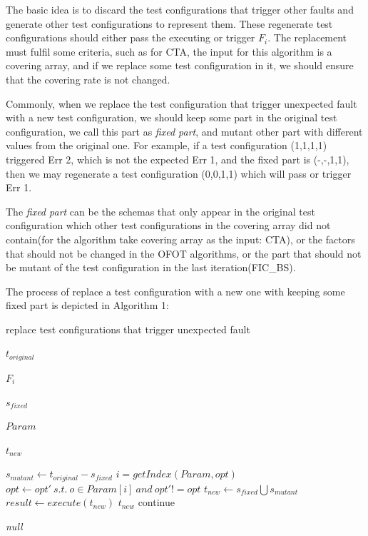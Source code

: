 \documentclass{sig-alternate}
\begin{document}
The basic idea is to discard the test configurations that trigger other faults and generate other test configurations to represent them. These regenerate test configurations should either pass the executing or trigger $F_{i}$.  The replacement must fulfil some criteria, such as for CTA, the input for this algorithm is a covering array, and if we replace some test configuration in it, we should ensure that the covering rate is not changed.

Commonly, when we replace the test configuration that trigger unexpected fault with a new test configuration, we should keep some part in the original test configuration, we call this part as \emph{fixed part}, and mutant other part with different values from the original one. For example, if a test configuration (1,1,1,1) triggered Err 2, which is not the expected Err 1, and the fixed part is (-,-,1,1), then we may regenerate a test configuration (0,0,1,1) which will pass or trigger Err 1.

The \emph{fixed part} can be the schemas that only appear in the original test configuration which other test configurations in the covering array did not contain(for the algorithm take covering array as the input: CTA), or the factors that should not be changed in the OFOT algorithms, or the part that should not be mutant of the test configuration in the last iteration(FIC\_BS).

The process of replace a test configuration with a new one with keeping some fixed part is depicted in Algorithm 1:

\begin{algorithm}
  \caption{replace test configurations that trigger unexpected fault}
  \begin{algorithmic}[1]
     \Require

     $t_{original}$ 

     $F_{i}$ 

     $s_{fixed}$ 

     $Param$ 


     \Ensure  $t_{new}$ 

       \State $s_{mutant} \leftarrow t_{original} - s_{fixed}$
          \State $i = getIndex(Param,opt) $
          \State $opt \leftarrow opt' \ s.t.\ o \in Param[i]\ and\ opt' != opt$
       \EndFor
       \State $t_{new} \leftarrow s_{fixed} \bigcup s_{mutant} $
       \State $result \leftarrow execute(t_{new})$
         \State \Return $t_{new}$
       \Else
         \State continue
       \EndIf
     \EndWhile

     \State \Return \emph{null}
  \end{algorithmic}
\end{algorithm}
\end{document}
